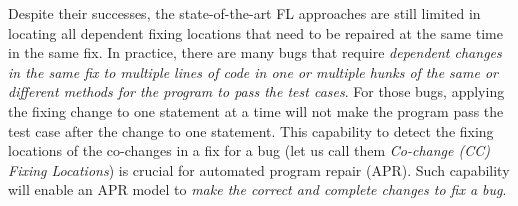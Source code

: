 
Despite their successes, the state-of-the-art FL approaches are still
limited in locating all dependent fixing locations that need to be
repaired at the same time in the same fix. In practice, there are
many bugs that require {\em dependent changes in the same fix to
  multiple lines of code in one or multiple hunks of the same or
  different methods for the program to pass the test cases}.
For those bugs, applying the fixing change to one statement at a time
will not make the program pass the test case after the change to one
statement.
%
This capability to detect the fixing locations of the co-changes in a
fix for a bug (let us call them {\em Co-change (CC) Fixing Locations})
is crucial for automated program repair (APR).
%
Such capability will enable an APR model to {\em make the
  correct and complete changes to fix a bug}.


